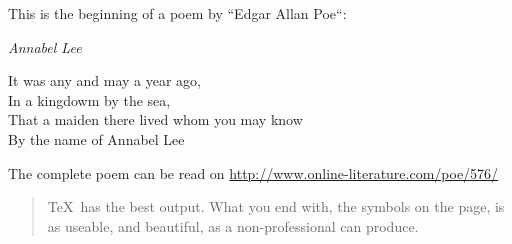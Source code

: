 \documentclass{article}
\begin{document}
  \noindent This is the beginning of a poem
    by ``Edgar Allan Poe``:

  \begin{center}
    \emph{Annabel Lee}
  \end{center}

  \begin{center}
    It was any and may a year ago, \\
    In a kingdowm by the sea, \\
    That a maiden there lived whom you may know \\
    By the name of Annabel Lee
  \end{center}

  The complete poem can be read on
  \url{http://www.online-literature.com/poe/576/}

  \begin{quotation}
    \TeX\ has the best output. What you end with,
    the symbols on the page, is as useable, and beautiful,
    as a non-professional can produce.
  \end{quotation}
\end{document}
